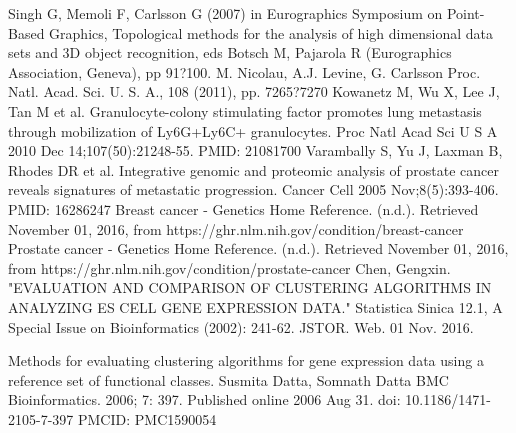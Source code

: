 \documentclass[preprint,10pt]{elsarticle}
\begin{document}
\begin{thebibliography}{2}
 Singh G, Memoli F, Carlsson G (2007) in Eurographics Symposium on Point-Based Graphics, Topological methods for the analysis of high dimensional data sets and 3D object recognition, eds Botsch M, Pajarola R (Eurographics Association, Geneva), pp 91?100.
M. Nicolau, A.J. Levine, G. Carlsson
Proc. Natl. Acad. Sci. U. S. A., 108 (2011), pp. 7265?7270
Kowanetz M, Wu X, Lee J, Tan M et al. Granulocyte-colony stimulating factor promotes lung metastasis through mobilization of Ly6G+Ly6C+ granulocytes. Proc Natl Acad Sci U S A 2010 Dec 14;107(50):21248-55. PMID: 21081700
Varambally S, Yu J, Laxman B, Rhodes DR et al. Integrative genomic and proteomic analysis of prostate cancer reveals signatures of metastatic progression. Cancer Cell 2005 Nov;8(5):393-406. PMID: 16286247
 Breast cancer - Genetics Home Reference. (n.d.). Retrieved November 01, 2016, from https://ghr.nlm.nih.gov/condition/breast-cancer
 Prostate cancer - Genetics Home Reference. (n.d.). Retrieved November 01, 2016, from https://ghr.nlm.nih.gov/condition/prostate-cancer
 Chen, Gengxin. "EVALUATION AND COMPARISON OF CLUSTERING ALGORITHMS IN ANALYZING ES CELL GENE EXPRESSION DATA." Statistica Sinica 12.1, A Special Issue on Bioinformatics (2002): 241-62. JSTOR. Web. 01 Nov. 2016.

 Methods for evaluating clustering algorithms for gene expression data using a reference set of functional classes. 
Susmita Datta, Somnath Datta
BMC Bioinformatics. 2006; 7: 397. Published online 2006 Aug 31. doi: 10.1186/1471-2105-7-397
PMCID: PMC1590054

\end{thebibliography}




\end{document}
